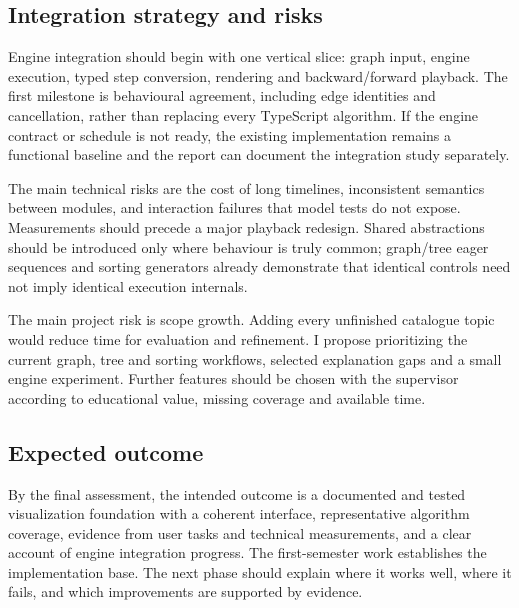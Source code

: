 \documentclass[11pt,a4paper]{article}
\newcommand{\page}{\par\vspace{8pt}}
\begin{document}
\subsection{Integration strategy and risks}
Engine integration should begin with one vertical slice: graph input, engine execution, typed step conversion, rendering and backward/forward playback. The first milestone is behavioural agreement, including edge identities and cancellation, rather than replacing every TypeScript algorithm. If the engine contract or schedule is not ready, the existing implementation remains a functional baseline and the report can document the integration study separately.

The main technical risks are the cost of long timelines, inconsistent semantics between modules, and interaction failures that model tests do not expose. Measurements should precede a major playback redesign. Shared abstractions should be introduced only where behaviour is truly common; graph/tree eager sequences and sorting generators already demonstrate that identical controls need not imply identical execution internals.

The main project risk is scope growth. Adding every unfinished catalogue topic would reduce time for evaluation and refinement. I propose prioritizing the current graph, tree and sorting workflows, selected explanation gaps and a small engine experiment. Further features should be chosen with the supervisor according to educational value, missing coverage and available time.

\subsection{Expected outcome}
By the final assessment, the intended outcome is a documented and tested visualization foundation with a coherent interface, representative algorithm coverage, evidence from user tasks and technical measurements, and a clear account of engine integration progress. The first-semester work establishes the implementation base. The next phase should explain where it works well, where it fails, and which improvements are supported by evidence.

\page
\begingroup
\small
\setlength{\parskip}{3pt}


\endgroup
\end{document}
